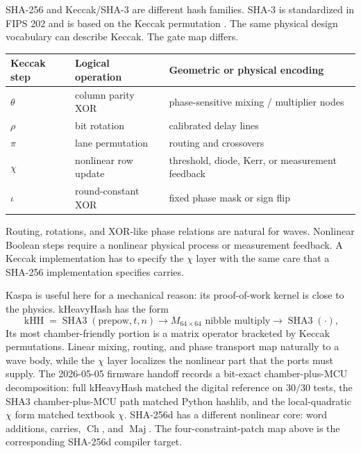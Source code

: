 \documentclass[11pt]{article}
\theoremstyle{definition}
\theoremstyle{remark}
\newcommand{\Ch}{\operatorname{Ch}}
\newcommand{\Maj}{\operatorname{Maj}}
\begin{document}
SHA-256 and Keccak/SHA-3 are different hash families. SHA-3 is standardized in
FIPS 202 and is based on the Keccak permutation \cite{NISTFIPS202}. The same
physical design vocabulary can describe Keccak. The gate map differs.

\begin{center}
\begin{minipage}{\linewidth}
\centering
\begin{tabular}{lll}
\toprule
Keccak step & Logical operation & Geometric or physical encoding\\
\midrule
\(\theta\) & column parity XOR & phase-sensitive mixing / multiplier nodes\\
\(\rho\) & bit rotation & calibrated delay lines\\
\(\pi\) & lane permutation & routing and crossovers\\
\(\chi\) & nonlinear row update & threshold, diode, Kerr, or measurement feedback\\
\(\iota\) & round-constant XOR & fixed phase mask or sign flip\\
\bottomrule
\end{tabular}
\label{tab:keccak}
\end{minipage}
\end{center}

Routing, rotations, and XOR-like phase relations are natural for waves.
Nonlinear Boolean steps require a nonlinear physical process or measurement
feedback. A Keccak implementation has to specify the \(\chi\) layer
with the same care that a SHA-256 implementation specifies carries.

Kaspa is useful here for a mechanical reason: its proof-of-work kernel is close
to the physics. kHeavyHash has the form
\[
\operatorname{kHH}
=
\operatorname{SHA3}(\mathrm{prepow},t,n)
\longrightarrow
M_{64\times64}\text{ nibble multiply}
\longrightarrow
\operatorname{SHA3}(\cdot),
\]
Its most chamber-friendly portion is a matrix operator bracketed by Keccak
permutations. Linear mixing, routing, and phase transport map naturally to a
wave body, while the \(\chi\) layer localizes the nonlinear part that the
ports must supply. The 2026-05-05 firmware handoff records a bit-exact
chamber-plus-MCU decomposition: full kHeavyHash matched the digital reference
on \(30/30\) tests, the SHA3 chamber-plus-MCU path matched Python hashlib, and
the local-quadratic \(\chi\) form matched textbook \(\chi\). SHA-256d has a different nonlinear core:
word additions, carries, \(\Ch\), and \(\Maj\). The four-constraint-patch map above is the
corresponding SHA-256d compiler target.
\end{document}
